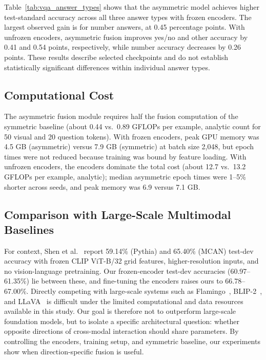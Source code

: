 \documentclass[conference]{IEEEtran}
\begin{document}
Table~\ref{tab:vqa_answer_types} shows that the asymmetric model achieves higher test-standard accuracy across all three answer types with frozen encoders. The largest observed gain is for number answers, at 0.45 percentage points. With unfrozen encoders, asymmetric fusion improves yes/no and other accuracy by 0.41 and 0.54 points, respectively, while number accuracy decreases by 0.26 points.  These results describe selected checkpoints and do not establish statistically significant differences within individual answer types.

\subsection{Computational Cost}

The asymmetric fusion module requires half the fusion computation of the symmetric baseline (about 0.44 vs.\ 0.89 GFLOPs per example, analytic count for 50 visual and 20 question tokens). With frozen encoders, peak GPU memory was 4.5 GB (asymmetric) versus 7.9 GB (symmetric) at batch size 2,048, but epoch times were not reduced because training was bound by feature loading. With unfrozen encoders, the encoders dominate the total cost (about 12.7 vs.\ 13.2 GFLOPs per example, analytic); median asymmetric epoch times were 1--5\% shorter across seeds, and peak memory was 6.9 versus 7.1 GB.

\subsection{Comparison with Large-Scale Multimodal Baselines}

For context, Shen et al.~\cite{shen2022clip} report 59.14\% (Pythia) and 65.40\% (MCAN) test-dev accuracy with frozen CLIP ViT-B/32 grid features, higher-resolution inputs, and no vision-language pretraining. Our frozen-encoder test-dev accuracies (60.97--61.35\%) lie between these, and fine-tuning the encoders raises ours to 66.78--67.00\%. Directly competing with large-scale systems such as Flamingo~\cite{alayrac2022flamingo}, BLIP-2~\cite{li2023blip2}, and LLaVA~\cite{liu2023visual} is difficult under the limited computational and data resources available in this study. Our goal is therefore not to outperform large-scale foundation models, but to isolate a specific architectural question: whether opposite directions of cross-modal interaction should share parameters. By controlling the encoders, training setup, and symmetric baseline, our experiments show when direction-specific fusion is useful. 
\end{document}

